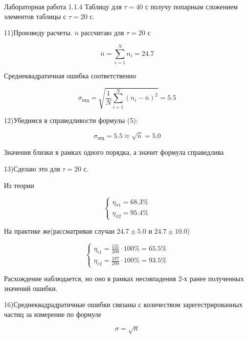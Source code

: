 \documentclass{astroedu-lab}
\begin{document}
\begin{problem}{\large Лабораторная работа 1.1.4}
Таблицу для $\tau = 40$ с получу попарным сложением элементов таблицы с $\tau = 20$ с.

11)Произведу расчеты. $\overline{n}$ рассчитаю для $\tau = 20$ с

\begin{equation}
\overline{n} = \sum^N_{i=1} n_i = 24.7
\end{equation}

Среднеквадратичная ошибка соответственно

\begin{equation}
\sigma_{\text{отд}} = \sqrt{\frac{1}{N} \sum^N_{i=1} \left( n_i - \overline{n} \right)^2} = 5.5
\end{equation}

12)Убедимся в справедливости формулы (5):

\begin{equation}
\sigma_{\text{отд}} = 5.5 \approx \sqrt{\overline{n}} = 5.0
\end{equation}

Значения близки в рамках одного порядка, а значит формула справедлива

13)Сделаю это для $\tau = 20$ с.

Из теории

\begin{equation}
\left\{
\begin{aligned}
\eta_{\sigma 1} = 68.3\%\\	
\eta_{\sigma 2} = 95.4\%
\end{aligned}
\right.
\end{equation}

На практике же(рассматривая случаи $24.7 \pm 5.0$ и $24.7 \pm 10.0$)

\begin{equation}
\left\{
\begin{aligned}
\eta_{r1} = \frac{131}{200}\cdot 100\% = 65.5\%\\	
\eta_{r2} = \frac{187}{200}\cdot 100\% = 93.5\%
\end{aligned}
\right.
\end{equation}

Расхождение наблюдается, но оно в рамках несовпадения 2-х ранее полученных значений ошибки.

16)Среднеквадрадратичные ошибки связаны с количеством зарегестрированных частиц за измерение по формуле

\begin{equation}
\sigma = \sqrt{n}
\end{equation}


\end{problem}
\end{document}
